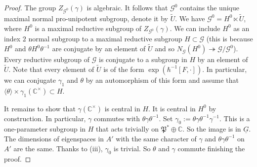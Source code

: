 \documentclass[12pt]{amsart}
\newcommand{\C}{\mathbb{C}}
\newcommand{\Z}{\mathbb{Z}}
\newcommand{\param}{\mathfrak{P}}
\theoremstyle{definition}
\numberwithin{equation}{section}
\begin{document}
\begin{proof}
The group $Z_{\mathcal{G}^0}(\gamma)$ is algebraic.
It follows that $\mathcal{G}^0$ contains the unique maximal
normal pro-unipotent subgroup, denote it by $\tilde{U}$. We have $\mathcal{G}^0=
H^0\ltimes \tilde{U}$, where $H^0$ is a maximal reductive subgroup of $Z_{\mathcal{G}^0}(\gamma)$.
We can include $H^0$ as an index $2$ normal subgroup to a maximal reductive subgroup  $H\subset \mathcal{G}$
(this is because $H^0$ and $\theta H^0\theta^{-1}$ are conjugate by an element of $\tilde{U}$ and so 
$N_{\mathcal{G}}(H^0)\twoheadrightarrow \mathcal{G}/\mathcal{G}^0$).
Every reductive subgroup of $\mathcal{G}$ is conjugate to a subgroup in $H$
by an element of $\tilde{U}$. Note that every element of $\tilde{U}$ is of the form 
$\exp(\hbar^{-1}[F,\cdot])$.
In particular, we can conjugate $\gamma_1$ and $\theta$ by an automorphism of this form and assume that 
$\langle\theta\rangle\times\gamma_1(\C^\times)\subset H$.

It remains to show that $\gamma(\C^\times)$ is central in $H$. It is central in $H^0$ by construction.
In particular, $\gamma$ commutes with $\theta \gamma \theta^{-1}$. Set $\gamma_0:=\theta\gamma \theta^{-1}\gamma^{-1}$.
This is a one-parameter subgroup in $H$ that acts trivially on $\param^*\oplus \C$. So the image is in 
$\underline{G}$. The dimensions of eigenspaces in $A'$ with the same character of $\gamma$ and $\theta\gamma \theta^{-1}$ on $A'$ are the same. 
Thanks to (iii), $\gamma_0$ is trivial. So $\theta$ and $\gamma$  commute finishing the proof.  
%
\end{proof}
\end{document}

